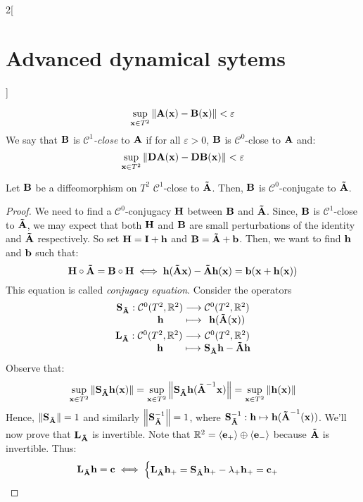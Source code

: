 \documentclass[../../../main_math.tex]{subfiles}
\begin{document}
\begin{multicols}{2}[\section{Advanced dynamical sytems}]
\begin{definition}
    $$
      \sup_{\vf{x}\in T^2}\norm{\vf{A}(\vf{x})-\vf{B}(\vf{x})}<\varepsilon
    $$
    We say that $\vf{B}$ is \emph{$\mathcal{C}^1$-close} to $\vf{A}$ if for all $\varepsilon>0$, $\vf{B}$ is $\mathcal{C}^0$-close to $\vf{A}$ and:
    $$
      \sup_{\vf{x}\in T^2}\norm{\vf{D}\vf{A}(\vf{x})-\vf{D}\vf{B}(\vf{x})}<\varepsilon
    $$
  \end{definition}
  \begin{theorem}
    Let $\vf{B}$ be a diffeomorphism on $T^2$ $\mathcal{C}^1$-close to $\vf{\tilde{A}}$. Then, $\vf{B}$ is $\mathcal{C}^0$-conjugate to $\vf{\tilde{A}}$.
  \end{theorem}
  \begin{proof}
    We need to find a $\mathcal{C}^0$-conjugacy $\vf{H}$ between $\vf{B}$ and $\vf{\tilde{A}}$. Since, $\vf{B}$ is $\mathcal{C}^1$-close to $\vf{\tilde{A}}$, we may expect that both $\vf{H}$ and $\vf{B}$ are small perturbations of the identity and $\vf{\tilde{A}}$ respectively. So set $\vf{H}=\vf{I}+\vf{h}$ and $\vf{B}=\vf{\tilde{A}}+\vf{b}$. Then, we want to find $\vf{h}$ and $\vf{b}$ such that:
    $$
      \vf{H}\circ \vf{\tilde{A}}=\vf{B}\circ \vf{H}\iff
      \vf{h}(\vf{\tilde{A}x})-\vf{\tilde{A}} \vf{h}(\vf{x})=\vf{b}(\vf{x}+\vf{h}(\vf{x}))
    $$
    This equation is called \emph{conjugacy equation}. Consider the operators
    \begin{gather*}
      \function{\vf{S}_{\vf{\tilde{A}}}}{\mathcal{C}^0(T^2,\RR^2)}{\mathcal{C}^0(T^2,\RR^2)}{\vf{h}}{\vf{h}(\vf{\tilde{A}}(\vf{x}))}\\
      \function{\vf{L}_{\vf{\tilde{A}}}}{\mathcal{C}^0(T^2,\RR^2)}{\mathcal{C}^0(T^2,\RR^2)}{\vf{h}}{\vf{S}_{\vf{\tilde{A}}}\vf{h}-\vf{\tilde{A}}\vf{h}}
    \end{gather*}
    Observe that:
    $$
      \sup_{\vf{x}\in T^2}\norm{\vf{S}_{\vf{\tilde{A}}}\vf{h}(\vf{x})}=\sup_{\vf{x}\in T^2}\norm{\vf{S}_{\vf{\tilde{A}}}\vf{h}(\vf{\tilde{A}}^{-1}\vf{x})}= \sup_{\vf{x}\in T^2}\norm{\vf{h}(\vf{x})}
    $$
    Hence, $\norm{\vf{S}_{\vf{\tilde{A}}}}=1$ and similarly $\norm{\vf{S}_{\vf{\tilde{A}}}^{-1}}=1$, where $\vf{S}_{\vf{\tilde{A}}}^{-1}:\vf{h}\mapsto \vf{h}(\vf{\tilde{A}}^{-1}(\vf{x}))$. We'll now prove that $\vf{L}_{\vf{\tilde{A}}}$ is invertible. Note that $\RR^2=\langle \vf{e}_+\rangle \oplus \langle \vf{e}_-\rangle$ because $\vf{\tilde{A}}$ is invertible. Thus:
    $$
      \vf{L}_{\vf{\tilde{A}}}\vf{h}=\vf{c}\iff \begin{cases}
        \vf{L}_{\vf{\tilde{A}}}\vf{h}_+=\vf{S}_{\vf{\tilde{A}}}\vf{h}_+-\lambda_+\vf{h}_+=\vf{c}_+ \\

\end{cases}$$
\end{proof}
\end{multicols}
\end{document}
